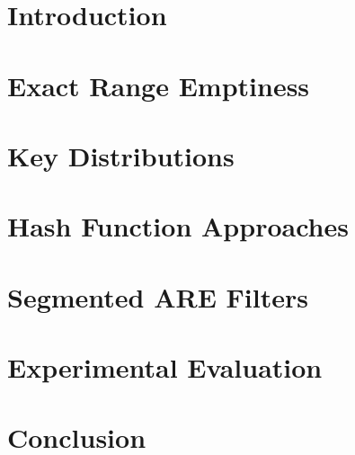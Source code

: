 \documentclass[12pt,a4paper,oneside]{report}
\begin{document}
    \tableofcontents


    \chapter{Introduction}
    \label{ch:introduction}

    
    
    

    
    


    \chapter{Exact Range Emptiness}
    \label{chap:ere}
    


    \chapter{Key Distributions}
    \label{chap:distributions}
    


    \chapter{Hash Function Approaches}
    \label{chap:hash}
    
    
    
    


    \chapter{Segmented ARE Filters}
    \label{chap:hybrid}

    


    \chapter{Experimental Evaluation}
    \label{chap:evaluation}
    


    \chapter{Conclusion}
    \label{chap:conclusion}
    

    
    
\end{document}
